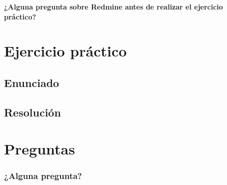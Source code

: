 \documentclass[
xcolor={svgnames},
hyperref={colorlinks,citecolor=DeepPink4,linkcolor=Black,urlcolor=DarkBlue}
]{beamer}
\begin{document}
\begin{frame}
	\begin{center}
{\Large 		\textbf{¿Alguna pregunta sobre Redmine antes de realizar el ejercicio práctico?}}
	\end{center}

\end{frame}

\section{Ejercicio práctico}

\subsection{Enunciado}
\begin{frame}

\end{frame}

\subsection{Resolución}

\begin{frame}

\end{frame}

\section{Preguntas}

\begin{frame}
	\frametitle{¿Alguna pregunta?}

\end{frame}

%
%	
%	 
%
%
\end{document}
